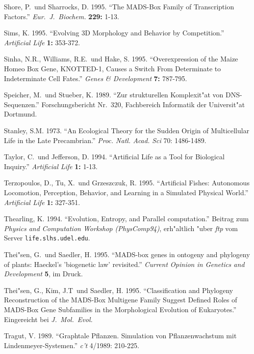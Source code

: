 \begin{thebibliography}{99}
Shore, P.\ und Sharrocks, D. 1995. "`The MADS-Box Family of Transcription Factors."'
\textsl{Eur.\ J.\ Biochem.} \textbf{229:} 1-13.

Sims, K. 1995. "`Evolving 3D Morphology and Behavior by Competition."' \textsl{Artificial
Life} \textbf{1:} 353-372.

Sinha, N.R., Williams, R.E.\ und Hake, S. 1995. "`Overexpression of the Maize Homeo Box
Gene, KNOTTED-1, Causes a Switch From Determinate to Indeterminate Cell Fates."'
\textsl{Genes \& Development} \textbf{7:} 787-795.

Speicher, M.\ und Stueber, K. 1989. "`Zur strukturellen Komplexit"at von DNS-Sequenzen."'
Forschungsbericht Nr.\ 320, Fachbereich Informatik der Universit"at Dortmund.

Stanley, S.M. 1973. "`An Ecological Theory for the Sudden Origin
of Multicellular Life in the Late Precambrian."' \textsl{Proc. Natl. Acad. Sci} 70: 1486-1489.

Taylor, C.\ und Jefferson, D. 1994. "`Artificial Life as a Tool for Biological Inquiry."'
\textsl{Artificial Life} \textbf{1:} 1-13.

Terzopoulos, D., Tu, X.\ und Grzeszczuk, R. 1995. "`Artificial Fishes: Autonomous
Locomotion, Perception, Behavior, and Learning  in a Simulated Physical World."'
\textsl{Artificial Life} \textbf{1:} 327-351.

Thearling, K. 1994. "`Evolution, Entropy, and Parallel computation."' Beitrag zum \textsl{Physics and
Computation Workshop (PhysComp94)}, erh"altlich "uber \textsl{ftp} vom Server \verb|life.slhs.udel.edu|.

Thei"sen, G.\ und Saedler, H. 1995. "`MADS-box genes in ontogeny and phylogeny
of plants: Haeckel's 'biogenetic law' revisited."' \textsl{Current Opinion in
Genetics and Development} \textbf{5}, im Druck.

Thei"sen, G., Kim, J.T\ und Saedler, H. 1995. "`Classification and Phylogeny Reconstruction of
the MADS-Box Multigene Family Suggest Defined Roles of MADS-Box Gene Subfamilies in the Morphological Evolution
of Eukaryotes."' Eingereicht bei \textsl{J.\ Mol.\ Evol.}

Tragut, V. 1989. "`Graphtale Pflanzen. Simulation von Pflanzenwachstum mit Lindenmeyer-Systemen."'
\textsl{c't} 4/1989: 210-225.


\end{thebibliography}
